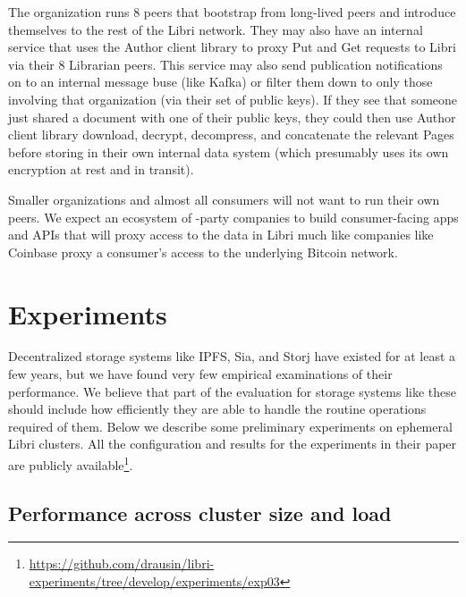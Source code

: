 \documentclass[10pt]{article}
\begin{document}
The organization runs 8 peers that bootstrap from long-lived peers and introduce themselves to the rest of the Libri network. They may also have an internal service that uses the Author client library to proxy Put and Get requests to Libri via their 8 Librarian peers. This service may also send publication notifications on to an internal message buse (like Kafka) or filter them down to only those involving that organization (via their set of public keys). If they see that someone just shared a document with one of their public keys, they could then use Author client library download, decrypt, decompress, and concatenate the relevant Pages before storing in their own internal data system (which presumably uses its own encryption at rest and in transit).

Smaller organizations and almost all consumers will not want to run their own peers. We expect an ecosystem of -party companies to build consumer-facing apps and APIs that will proxy access to the data in Libri much like companies like Coinbase proxy a consumer's access to the underlying Bitcoin network.


\section{Experiments}
\label{sec:exps}

Decentralized storage systems like IPFS, Sia, and Storj have existed for at least a few years, but we have found very few empirical examinations of their performance. We believe that part of the evaluation for storage systems like these should include how efficiently they are able to handle the routine operations required of them. Below we describe some preliminary experiments on ephemeral Libri clusters. All the configuration and results for the experiments in their paper are publicly available\footnote{\url{https://github.com/drausin/libri-experiments/tree/develop/experiments/exp03}}.

\subsection{Performance across cluster size and load}
\end{document}
